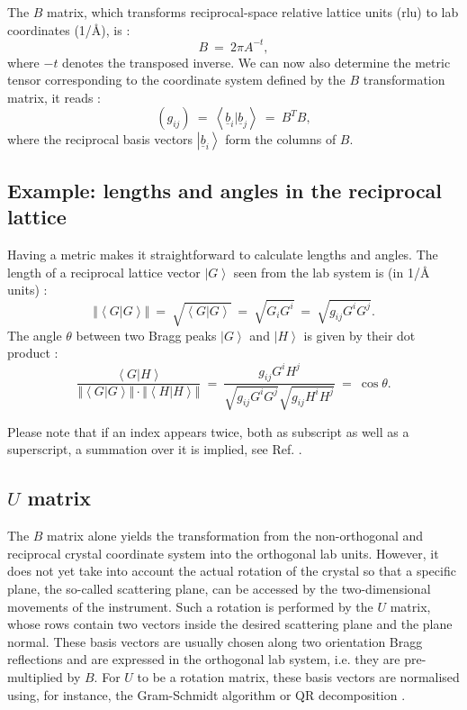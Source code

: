 The $B$ matrix, which transforms reciprocal-space relative lattice units (rlu) to lab coordinates (1/\AA), is \cite[p. 60]{Gross2012}:
\begin{equation} B \ =\  2 \pi A^{-t}, \end{equation}
where $-t$ denotes the transposed inverse.
We can now also determine the metric tensor corresponding to the coordinate system defined by the $B$ transformation matrix, it reads \cite[p. 808]{Arens2015}:
\begin{equation}
	\left(g_{ij}\right) \ =\  \left<\underline{b}_i | \underline{b}_j \right> \ =\  B^T B,
\end{equation}
where the reciprocal basis vectors $\left| \underline{b}_i \right>$ form the columns of $B$.


\subsection{Example: lengths and angles in the reciprocal lattice}
Having a metric makes it straightforward to calculate lengths and angles.
The length of a reciprocal lattice vector $\left| G \right>$ seen from the lab system is (in 1/\AA{} units) \cite[p. 808]{Arens2015}:
\begin{equation}
	\left\Vert \left< G | G \right> \right\Vert \ =\  \sqrt{\left< G | G \right>} \ =\  \sqrt{G_i G^i} \ =\  \sqrt{g_{ij} G^i G^j}.
\end{equation}
The angle $\theta$ between two Bragg peaks $\left| G \right>$ and $\left| H \right>$ is given by their dot product \cite[p. 808]{Arens2015}:
\begin{equation}
	\frac{\left< G | H \right>}{\left\Vert \left< G | G \right> \right\Vert \cdot \left\Vert \left< H | H \right> \right\Vert} \ =\  
	\frac{g_{ij} G^i H^j }{\sqrt{g_{ij} G^i G^j} \sqrt{g_{ij} H^i H^j}} \ =\  \cos \theta.
\end{equation}

Please note that if an index appears twice, both as subscript as well as a superscript, a summation over it is implied, see Ref. \cite{wiki_summation}.


\subsection{$U$ matrix}
The $B$ matrix alone yields the transformation from the non-orthogonal and reciprocal crystal coordinate system into the orthogonal lab units.
However, it does not yet take into account the actual rotation of the crystal so that a specific plane, the so-called scattering plane, 
can be accessed by the two-dimensional movements of the instrument. 
Such a rotation is performed by the $U$ matrix, whose rows contain two vectors inside the desired scattering plane and the plane normal. 
These basis vectors are usually chosen along two orientation Bragg reflections and are expressed in the orthogonal lab system, i.e. they are
pre-multiplied by $B$.
For $U$ to be a rotation matrix, these basis vectors are normalised using, for instance, the Gram-Schmidt algorithm \cite[p. 744]{Arens2015} or 
QR decomposition \cite[pp. 269-272]{Scarpino2011}.

